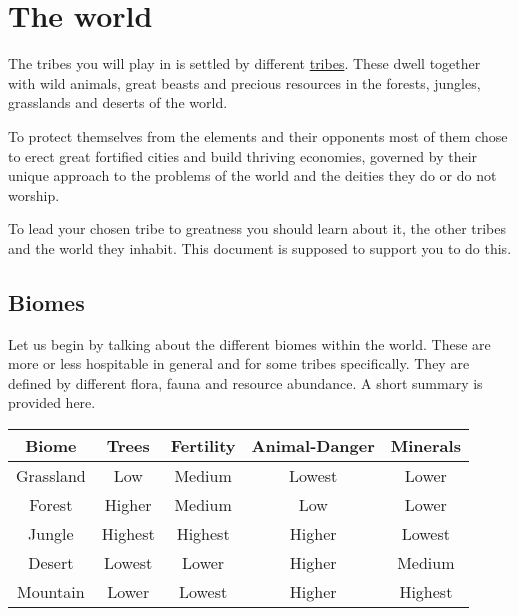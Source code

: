 \chapter{The world}\label{ch:World}

The tribes you will play in is settled by different
\hyperref[ch:Tribes]{tribes}. These dwell together with wild animals, great
beasts and precious resources in the forests, jungles, grasslands and deserts
of the world.

To protect themselves from the elements and their opponents most of them chose
to erect great fortified cities and build thriving economies, governed by their
unique approach to the problems of the world and the deities they do or do not
worship.

To lead your chosen tribe to greatness you should learn about it, the other
tribes and the world they inhabit. This document is supposed to support you to
do this.

\section{Biomes}\label{ch:World:Biomes}

Let us begin by talking about the different biomes within the world. These are
more or less hospitable in general and for some tribes specifically. They are
defined by different flora, fauna and resource abundance. A short summary is
provided here.

\begin{longtable}{cc ccc}
	\toprule
	Biome           & Trees   & Fertility & Animal-Danger & Minerals \\
	\midrule
	\Gls{Grassland} & Low     & Medium    & Lowest        & Lower    \\
	\Gls{Forest}    & Higher  & Medium    & Low           & Lower    \\
	\Gls{Jungle}    & Highest & Highest   & Higher        & Lowest   \\
	\Gls{Desert}    & Lowest  & Lower     & Higher        & Medium   \\
	\Gls{Mountain}  & Lower   & Lowest    & Higher        & Highest  \\
	\bottomrule
\end{longtable}

\subsection{}\label{ch:World:Biomes:Grassland}

